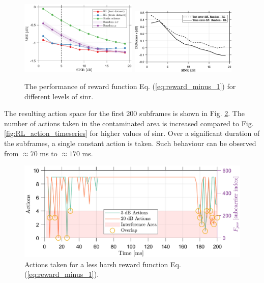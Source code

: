 \begin{figure}
    \centering
    \includegraphics[width=0.5\textwidth]{chapters/part_uplink/figures/results/rewardadjustsment_-1/SINR_sweep.eps}
    \includegraphics[width=0.45\textwidth]{chapters/part_uplink/figures/results/rewardadjustsment_-1/SINR_sweep_diff.eps}
    \caption{The performance of reward function Eq. (\ref{eq:reward_minus_1}) for different levels of \gls{sinr}.}
    \label{fig:RL_different_reward_-1}
\end{figure}

The resulting action space for the first 200 subframes is shown in Fig. \ref{fig:RL_different_reward_-1_actions}. The number of actions taken in the contaminated area is increased compared to Fig. \ref{fig:RL_action_timeseries} for higher values of \gls{sinr}. Over a significant duration of the subframes, a single constant action is taken. Such behaviour can be observed from $\approx 70$ ms to $\approx 170$ ms.


\begin{figure}
    \centering
    \includegraphics{chapters/part_uplink/figures/results/rewardadjustsment_-1/action_timeseries.eps}
    \caption{Actions taken for a less harsh reward function Eq. (\ref{eq:reward_minus_1}).}
    \label{fig:RL_different_reward_-1_actions}
\end{figure}

